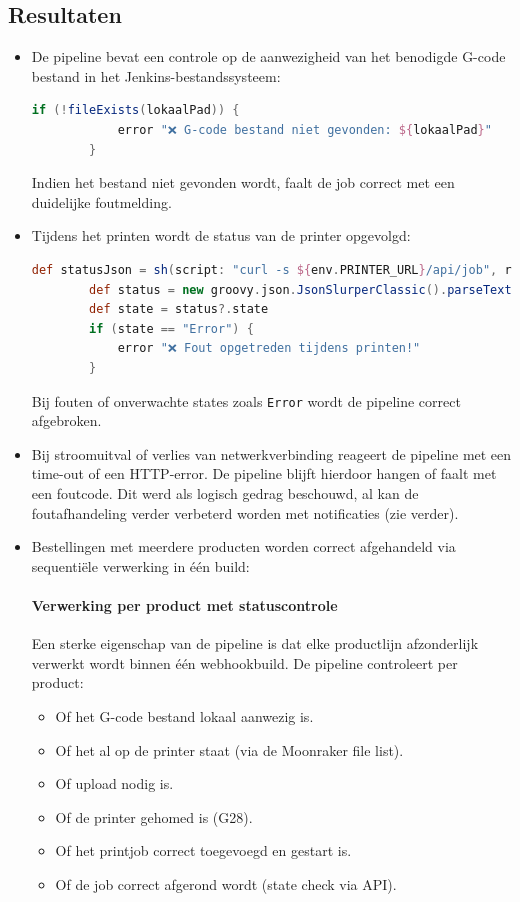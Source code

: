 \begin{enumerate}
\subsection{Resultaten}
\begin{itemize}
    \item De pipeline bevat een controle op de aanwezigheid van het benodigde G-code bestand in het Jenkins-bestandssysteem:
    \begin{lstlisting}[language=groovy]
        if (!fileExists(lokaalPad)) {
            error "❌ G-code bestand niet gevonden: ${lokaalPad}"
        }
    \end{lstlisting}
    Indien het bestand niet gevonden wordt, faalt de job correct met een duidelijke foutmelding.
    
    \item Tijdens het printen wordt de status van de printer opgevolgd:
    \begin{lstlisting}[language=groovy]
        def statusJson = sh(script: "curl -s ${env.PRINTER_URL}/api/job", returnStdout: true)
        def status = new groovy.json.JsonSlurperClassic().parseText(statusJson)
        def state = status?.state
        if (state == "Error") {
            error "❌ Fout opgetreden tijdens printen!"
        }
    \end{lstlisting}
    Bij fouten of onverwachte states zoals \texttt{Error} wordt de pipeline correct afgebroken.
    
    \item Bij stroomuitval of verlies van netwerkverbinding reageert de pipeline met een time-out of een HTTP-error. De pipeline blijft hierdoor hangen of faalt met een foutcode. Dit werd als logisch gedrag beschouwd, al kan de foutafhandeling verder verbeterd worden met notificaties (zie verder).
    
    \item Bestellingen met meerdere producten worden correct afgehandeld via sequentiële verwerking in één build:
    \paragraph{Verwerking per product met statuscontrole}
    
    Een sterke eigenschap van de pipeline is dat elke productlijn afzonderlijk verwerkt wordt binnen één webhookbuild. De pipeline controleert per product:
    
    \begin{itemize}
        \item Of het G-code bestand lokaal aanwezig is.
        \item Of het al op de printer staat (via de Moonraker file list).
        \item Of upload nodig is.
        \item Of de printer gehomed is (G28).
        \item Of het printjob correct toegevoegd en gestart is.
        \item Of de job correct afgerond wordt (state check via API).
    \end{itemize}
    

\end{itemize}
\end{enumerate}
